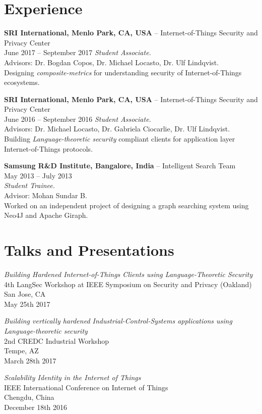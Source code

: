 \documentclass[letterpaper,10pt]{article}
\renewenvironment{itemize}{
  \begin{list}{}{
    \setlength{\leftmargin}{1.5em}
  }
}{
  \end{list}
}
\begin{document}
\section*{Experience}
\begin{itemize}
\setlength\itemsep{0ex}
\item \textbf{SRI International, Menlo Park, CA, USA} -- Internet-of-Things Security and Privacy Center\\
    June 2017 -- September 2017
    \textit{Student Associate.} \\ Advisors: Dr. Bogdan Copos, Dr. Michael Locasto, Dr. Ulf Lindqvist.\\
    Designing \textit{composite-metrics} for understanding security of Internet-of-Things ecosystems.
\item \textbf{SRI International, Menlo Park, CA, USA} -- Internet-of-Things Security and Privacy Center\\
    June 2016 -- September 2016
    \textit{Student Associate.} \\ Advisors: Dr. Michael Locasto, Dr. Gabriela Ciocarlie, Dr. Ulf Lindqvist.\\
    Building \textit{Language-theoretic security} compliant clients for application layer Internet-of-Things protocols.
\item \textbf{Samsung R\&D Institute, Bangalore, India} -- Intelligent Search Team\\
    May 2013 -- July 2013\\
    \textit{Student Trainee.} \\ Advisor: Mohan Sundar B.\\
    Worked on an independent project of designing a graph searching system using Neo4J and Apache Giraph.
\end{itemize}


\section*{Talks and Presentations}
\begin{itemize}
\setlength\itemsep{0ex}
\item \textit{Building Hardened Internet-of-Things Clients using Language-Theoretic Security}\\ 4th LangSec Workshop at IEEE Symposium on Security and Privacy (Oakland)\\ San Jose, CA\\ May 25th 2017
\item \textit{Building vertically hardened Industrial-Control-Systems applications using Language-theoretic security}\\ 2nd CREDC Industrial Workshop\\ Tempe, AZ\\ March 28th 2017
\item \textit{Scalability Identity in the Internet of Things}\\ IEEE International Conference on Internet of Things\\ Chengdu, China\\ December 18th 2016
\end{itemize}
\end{document}

